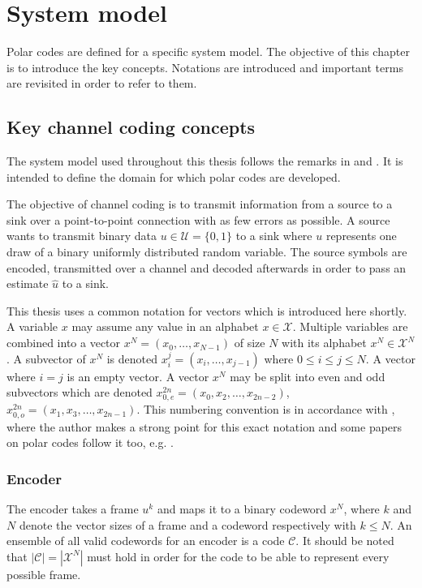\acresetall
\chapter{System model}\label{chapter:systemmodel}
Polar codes are defined for a specific system model.
The objective of this chapter is to introduce the key concepts.
Notations are introduced and important terms are revisited in order to refer to them.

\section{Key channel coding concepts}
The system model used throughout this thesis follows the remarks in \cite{Richardson:2008:MCT} and \cite{polar:arikan09}.
It is intended to define the domain for which polar codes are developed.

The objective of channel coding is to transmit information from a source to a sink over a point-to-point connection with as few errors as possible.
A source wants to transmit binary data  $u \in \mathcal{U} = \{0, 1\}$ to a sink where $u$ represents one draw of a binary uniformly distributed random variable.
The source symbols are encoded, transmitted over a channel and decoded afterwards in order to pass an estimate $\hat{u}$ to a sink.

This thesis uses a common notation for vectors which is introduced here shortly.
A variable $x$ may assume any value in an alphabet $x \in \mathcal{X}$.
Multiple variables are combined into a vector $x^N = (x_0, \dots , x_{N-1})$ of size $N$ with its alphabet $x^N \in \mathcal{X}^N$.
A subvector of $x^N$ is denoted $x_i^j = (x_i, \dots, x_{j-1})$ where $0 \leq i \leq j \leq N$.
A vector where $i=j$ is an empty vector.
A vector $x^N$ may be split into even and odd subvectors which are denoted $x_{0,e}^{2n} = (x_0, x_2, \dots, x_{2n-2})$, $x_{0,o}^{2n} = (x_1, x_3, \dots, x_{2n-1})$.
This numbering convention is in accordance with \cite{dijkstra:zerocounting}, where the author makes a strong point for this exact notation and some papers on polar codes follow it too, e.g. \cite{polar:talvardy:howtoCC}.


\subsection{Encoder}
The encoder takes a frame $u^k$ and maps it to a binary codeword $x^N$, where $k$ and $N$ denote the vector sizes of a frame and a codeword respectively with $k \leq N$.
An ensemble of all valid codewords for an encoder is a code $\mathcal{C}$.
It should be noted that $|\mathcal{C}| = |\mathcal{X}^N|$ must hold in order for the code to be able to represent every possible frame.

